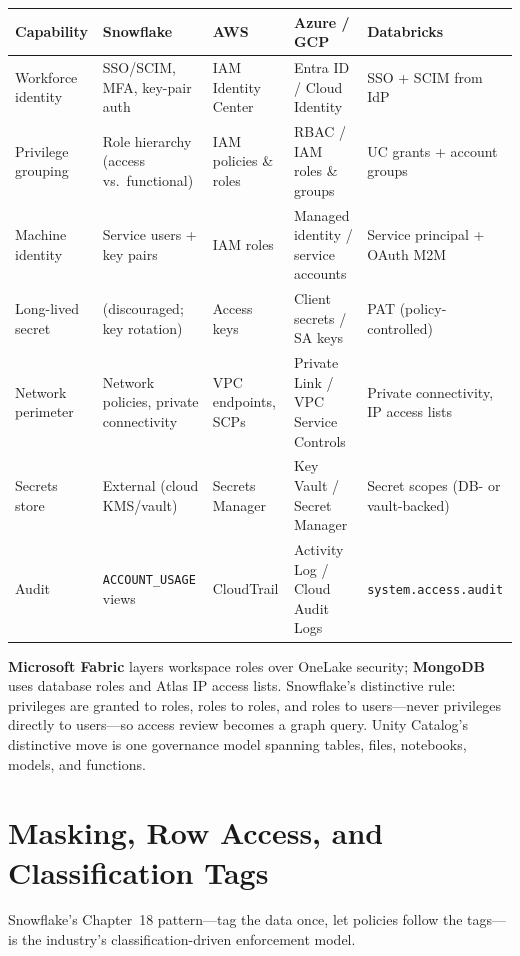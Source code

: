 \begin{center}
\footnotesize
\begin{tabular}{@{}p{2.5cm}p{2.9cm}p{2.7cm}p{2.9cm}p{2.9cm}@{}}
\toprule
\textbf{Capability} & \textbf{Snowflake} & \textbf{AWS} & \textbf{Azure / GCP} & \textbf{Databricks} \\
\midrule
Workforce identity & SSO/SCIM, MFA, key-pair auth & IAM Identity Center & Entra ID / Cloud Identity & SSO + SCIM from IdP \\
Privilege grouping & Role hierarchy (access vs.\ functional) & IAM policies \& roles & RBAC / IAM roles \& groups & UC grants + account groups \\
Machine identity & Service users + key pairs & IAM roles & Managed identity / service accounts & Service principal + OAuth M2M \\
Long-lived secret & (discouraged; key rotation) & Access keys & Client secrets / SA keys & PAT (policy-controlled) \\
Network perimeter & Network policies, private connectivity & VPC endpoints, SCPs & Private Link / VPC Service Controls & Private connectivity, IP access lists \\
Secrets store & External (cloud KMS/vault) & Secrets Manager & Key Vault / Secret Manager & Secret scopes (DB- or vault-backed) \\
Audit & \texttt{ACCOUNT\_USAGE} views & CloudTrail & Activity Log / Cloud Audit Logs & \texttt{system.access.audit} \\
\bottomrule
\end{tabular}
\end{center}

\noindent \textbf{Microsoft Fabric} layers workspace roles over OneLake security;
\textbf{MongoDB} uses database roles and Atlas IP access lists. Snowflake's distinctive rule:
privileges are granted to roles, roles to roles, and roles to users---never privileges directly
to users---so access review becomes a graph query. Unity Catalog's distinctive move is one
governance model spanning tables, files, notebooks, models, and functions.

\section{Masking, Row Access, and Classification Tags}
%
Snowflake's Chapter~18 pattern---tag the data once, let policies follow the tags---is the
industry's classification-driven enforcement model.

